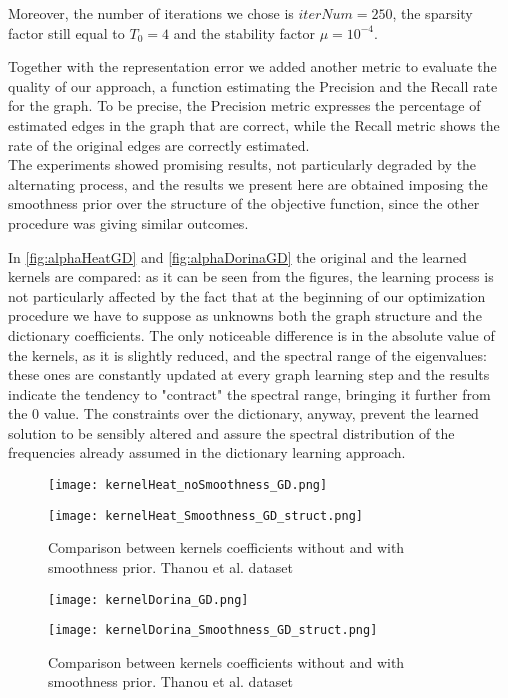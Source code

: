 Moreover, the number of iterations we chose is $iterNum = 250$, the sparsity factor still equal to $T_0 = 4$ and the stability factor $\mu = 10^{-4}$.

Together with the representation error we added another metric to evaluate the quality of our approach, a function estimating the Precision and the Recall rate for the graph. To be precise, the Precision metric expresses the percentage of estimated edges in the graph that are correct, while the Recall metric shows the rate of the original edges are correctly estimated.\\
The experiments showed promising results, not particularly degraded by the alternating process, and the results we present here are obtained imposing the smoothness prior over the structure of the objective function, since the other procedure was giving similar outcomes.

In \autoref{fig:alphaHeatGD} and \autoref{fig:alphaDorinaGD} the original and the learned kernels are compared: as it can be seen from the figures, the learning process is not particularly affected  by the fact that at the beginning of our optimization procedure we have to suppose as unknowns both the graph structure and the dictionary coefficients. The only noticeable difference is in the absolute value of the kernels, as it is slightly reduced, and the spectral range of the eigenvalues: these ones are constantly updated at every graph learning step and the results indicate the tendency to "contract" the spectral range, bringing it further from the 0 value. The constraints over the dictionary, anyway, prevent the learned solution to be sensibly altered and assure the spectral distribution of the frequencies already assumed in the dictionary learning approach.

\begin{figure}[hb]
  \begin{minipage}[c]{.5\textwidth}
    \centering
    \texttt{[image: kernelHeat\_noSmoothness\_GD.png]}
  \end{minipage}
  \begin{minipage}[c]{.5\textwidth}
    \centering
    \texttt{[image: kernelHeat\_Smoothness\_GD\_struct.png]}
  \end{minipage}
  \caption{Comparison between kernels coefficients without and with smoothness prior. Thanou et al.   dataset}
  \label{fig:alphaHeatGD}
\end{figure}

\begin{figure}[h]
  \begin{minipage}[c]{.5\textwidth}
    \centering
    \texttt{[image: kernelDorina\_GD.png]}
  \end{minipage}
  \begin{minipage}[c]{.5\textwidth}
    \centering
    \texttt{[image: kernelDorina\_Smoothness\_GD\_struct.png]}
  \end{minipage}
  \caption{Comparison between kernels coefficients without and with smoothness prior. Thanou et al. dataset}
  \label{fig:alphaDorinaGD}
\end{figure}

